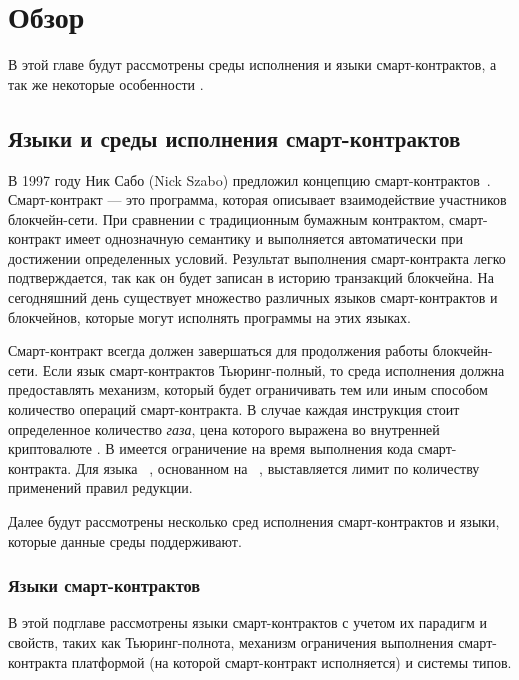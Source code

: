 \section{Обзор}
В этой главе будут рассмотрены среды исполнения и языки смарт-контрактов, а так же некоторые особенности .

\subsection{Языки и среды исполнения смарт-контрактов}
В 1997 году Ник Сабо (Nick Szabo) предложил концепцию смарт-контрактов~\cite{Szabo_SC}.
Смарт-контракт --- это программа, которая описывает взаимодействие участников блокчейн-сети. 
При сравнении с традиционным бумажным контрактом, смарт-контракт имеет однозначную семантику и выполняется автоматически при достижении определенных условий.
Результат выполнения смарт-контракта легко подтверждается, так как он будет записан в историю транзакций блокчейна.
На сегодняшний день существует множество различных языков смарт-контрактов и блокчейнов, которые могут исполнять программы на этих языках.

Смарт-контракт всегда должен завершаться для продолжения работы блокчейн-сети.
Если язык смарт-контрактов Тьюринг-полный, то среда исполнения должна предоставлять механизм, который будет ограничивать тем или иным способом количество операций смарт-контракта.
В случае  каждая инструкция стоит определенное количество \emph{газа}, цена которого выражена во внутренней криптовалюте .
В  имеется ограничение на время выполнения кода смарт-контракта.
Для языка ~\cite{Rholang}, основанном на ~\cite{RhoCalculus}, выставляется лимит по количеству применений правил редукции.

Далее будут рассмотрены несколько сред исполнения смарт-кон\-трак\-тов и языки, которые данные среды поддерживают.

\subsubsection{Языки смарт-контрактов}
В этой подглаве рассмотрены языки смарт-контрактов с учетом их парадигм и свойств, таких как Тьюринг-полнота, механизм ограничения выполнения смарт-контракта платформой (на которой смарт-контракт исполняется) и системы типов.

